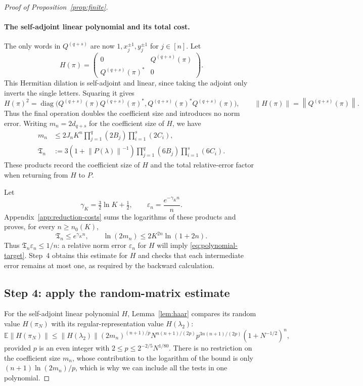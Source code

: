 \documentclass[11pt]{article}
\numberwithin{equation}{section}
\theoremstyle{boldremark}\newtheorem{remark}[theorem]{Remark}
\newcommand{\E}{\mathbb E}
\newcommand{\norm}[1]{\left\lVert #1\right\rVert}
\begin{document}
\begin{proof}[Proof of Proposition~\ref{prop:finite}]
\paragraph{The self-adjoint linear polynomial and its total cost.}
The only words in $Q^{(q+s)}$ are now
$1,x_j^{\pm1},y_j^{\pm1}$ for $j\in[n]$.
Let
\[
 H(\pi)=
 \begin{pmatrix}
 0&Q^{(q+s)}(\pi)\\ Q^{(q+s)}(\pi)^*&0
 \end{pmatrix}.
\]
This Hermitian dilation is self-adjoint and linear, since taking the
adjoint only inverts the single letters. Squaring it gives
\[
 H(\pi)^2=\operatorname{diag}\bigl(
 Q^{(q+s)}(\pi)Q^{(q+s)}(\pi)^*,
 Q^{(q+s)}(\pi)^*Q^{(q+s)}(\pi)\bigr),
 \qquad \norm{H(\pi)}=\norm{Q^{(q+s)}(\pi)}.
\]
Thus the final operation doubles the coefficient size and introduces
no norm error. Writing $m_n=2d_{q+s}$ for the coefficient size of $H$,
we have
\begin{align}
 m_n&\le2J_nK^n\prod_{j=1}^q(2B_j)\prod_{i=1}^s(2C_i),
 \label{eq:coefficient-product}\\
 \mathfrak T_n&:=3(1+\norm{P(\lambda)}^{-1})
             \prod_{j=1}^q(6B_j)\prod_{i=1}^s(6C_i).
 \label{eq:error-product}
\end{align}
These products record the coefficient size of $H$ and the total
relative-error factor when returning from $H$ to $P$.

Let
\begin{equation}
 \gamma_K=\tfrac32\ln K+\tfrac12,\qquad
 \varepsilon_n=\frac{e^{-\gamma_Kn}}n.
 \label{eq:tolerance}
\end{equation}
Appendix~\ref{app:reduction-costs} sums the logarithms of these products
and proves, for every $n\ge n_0(K)$,
\begin{equation}
 \mathfrak T_n\le e^{\gamma_Kn},\qquad
 \ln(2m_n)\le2K^{2n}\ln(1+2n).
 \label{eq:error-size}
\end{equation}
Thus $\mathfrak T_n\varepsilon_n\le1/n$: a relative norm error
$\varepsilon_n$ for $H$ will imply \eqref{eq:polynomial-target}.
Step~4 obtains this estimate for $H$ and checks that each intermediate
error remains at most one, as required by the backward calculation.

\subsection{Step 4: apply the random-matrix estimate}
\label{sec:finish-finite}

For the self-adjoint linear polynomial $H$, Lemma~\ref{lem:haar}
compares its random value $H(\pi_N)$ with its regular-representation
value $H(\lambda_2)$:
\begin{equation}
 \E\norm{H(\pi_N)}\le\norm{H(\lambda_2)}
 (2m_n)^{(n+1)/p}N^{n(n+1)/(2p)}
 p^{3n(n+1)/(2p)}(1+N^{-1/2})^n,
 \label{eq:haar}
\end{equation}
provided $p$ is an even integer with
$2\le p\le2^{-2/5}N^{1/80}$. There is no restriction on the coefficient
size $m_n$, whose contribution to the logarithm of the bound is only
$(n+1)\ln(2m_n)/p$, which is why we can include all the tests in one
polynomial.


\end{proof}
\end{document}
